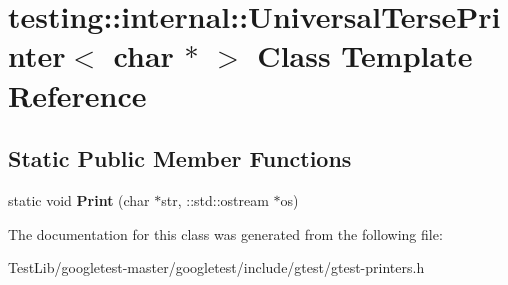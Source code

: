 \hypertarget{classtesting_1_1internal_1_1UniversalTersePrinter_3_01char_01_5_01_4}{}\section{testing\+:\+:internal\+:\+:Universal\+Terse\+Printer$<$ char $\ast$ $>$ Class Template Reference}
\label{classtesting_1_1internal_1_1UniversalTersePrinter_3_01char_01_5_01_4}
\subsection*{Static Public Member Functions}
\begin{DoxyCompactItemize}
\item 
\mbox{\label{classtesting_1_1internal_1_1UniversalTersePrinter_3_01char_01_5_01_4_aa9ef95587c1461fe33e254af52401a43}} 
static void {\bfseries Print} (char $\ast$str, \+::std\+::ostream $\ast$os)
\end{DoxyCompactItemize}


The documentation for this class was generated from the following file\+:\begin{DoxyCompactItemize}
\item 
Test\+Lib/googletest-\/master/googletest/include/gtest/gtest-\/printers.\+h\end{DoxyCompactItemize}
